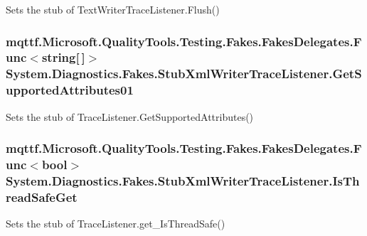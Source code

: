 Sets the stub of Text\-Writer\-Trace\-Listener.\-Flush()

\hypertarget{class_system_1_1_diagnostics_1_1_fakes_1_1_stub_xml_writer_trace_listener_a46c2a38f8b5dca50710cf2c2ad07886a}{
\subsubsection[{Get\-Supported\-Attributes01}]{\setlength{\rightskip}{0pt plus 5cm}mqttf.\-Microsoft.\-Quality\-Tools.\-Testing.\-Fakes.\-Fakes\-Delegates.\-Func$<$string\mbox{[}$\,$\mbox{]}$>$ System.\-Diagnostics.\-Fakes.\-Stub\-Xml\-Writer\-Trace\-Listener.\-Get\-Supported\-Attributes01}}\label{class_system_1_1_diagnostics_1_1_fakes_1_1_stub_xml_writer_trace_listener_a46c2a38f8b5dca50710cf2c2ad07886a}


Sets the stub of Trace\-Listener.\-Get\-Supported\-Attributes()

\hypertarget{class_system_1_1_diagnostics_1_1_fakes_1_1_stub_xml_writer_trace_listener_ae53f7ba7d41121ea3fb05afdf7184161}{
\subsubsection[{Is\-Thread\-Safe\-Get}]{\setlength{\rightskip}{0pt plus 5cm}mqttf.\-Microsoft.\-Quality\-Tools.\-Testing.\-Fakes.\-Fakes\-Delegates.\-Func$<$bool$>$ System.\-Diagnostics.\-Fakes.\-Stub\-Xml\-Writer\-Trace\-Listener.\-Is\-Thread\-Safe\-Get}}\label{class_system_1_1_diagnostics_1_1_fakes_1_1_stub_xml_writer_trace_listener_ae53f7ba7d41121ea3fb05afdf7184161}


Sets the stub of Trace\-Listener.\-get\-\_\-\-Is\-Thread\-Safe()

